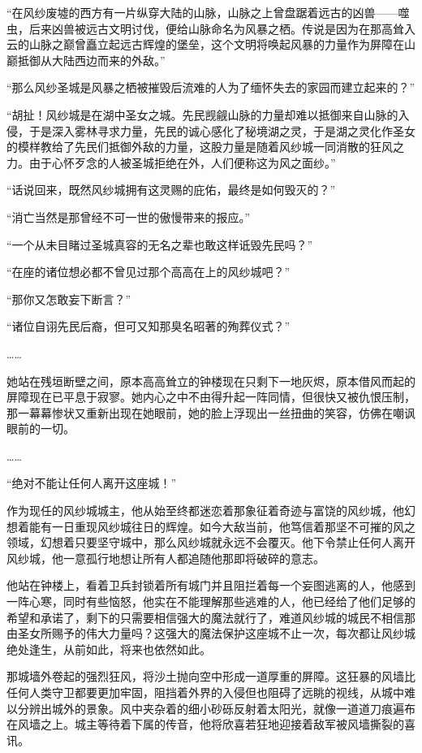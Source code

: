 \clearpage
{}


“在风纱废墟的西方有一片纵穿大陆的山脉，山脉之上曾盘踞着远古的凶兽——噬虫，后来凶兽被远古文明讨伐，便给山脉命名为风暴之栖。传说是因为在那高耸入云的山脉之巅曾矗立起远古辉煌的堡垒，这个文明将唤起风暴的力量作为屏障在山巅抵御从大陆西边而来的外敌。”

“那么风纱圣城是风暴之栖被摧毁后流难的人为了缅怀失去的家园而建立起来的？”

“胡扯！风纱城是在湖中圣女之城。先民觊觎山脉的力量却难以抵御来自山脉的入侵，于是深入雾林寻求力量，先民的诚心感化了秘境湖之灵，于是湖之灵化作圣女的模样教给了先民们抵御外敌的力量，这股力量是随着风纱城一同消散的狂风之力。由于心怀歹念的人被圣城拒绝在外，人们便称这为风之面纱。”

“话说回来，既然风纱城拥有这灵赐的庇佑，最终是如何毁灭的？”

“消亡当然是那曾经不可一世的傲慢带来的报应。”

“一个从未目睹过圣城真容的无名之辈也敢这样诋毁先民吗？”

“在座的诸位想必都不曾见过那个高高在上的风纱城吧？”

“那你又怎敢妄下断言？”

“诸位自诩先民后裔，但可又知那臭名昭著的殉葬仪式？”

……

她站在残垣断壁之间，原本高高耸立的钟楼现在只剩下一地灰烬，原本借风而起的屏障现在已平息于寂寥。她内心之中不由得升起一阵同情，但很快又被仇恨压制，那一幕幕惨状又重新出现在她眼前，她的脸上浮现出一丝扭曲的笑容，仿佛在嘲讽眼前的一切。

……

“绝对不能让任何人离开这座城！”

作为现任的风纱城城主，他从始至终都迷恋着那象征着奇迹与富饶的风纱城，他幻想着能有一日重现风纱城往日的辉煌。如今大敌当前，他笃信着那坚不可摧的风之领域，幻想着只要坚守城中，那么风纱城就永远不会覆灭。他下令禁止任何人离开风纱城，他一意孤行地想让所有人都追随他那即将破碎的意志。

他站在钟楼上，看着卫兵封锁着所有城门并且阻拦着每一个妄图逃离的人，他感到一阵心寒，同时有些恼怒，他实在不能理解那些逃难的人，他已经给了他们足够的希望和承诺了，剩下的只需要相信强大的魔法就行了，难道风纱城的城民不相信那由圣女所赐予的伟大力量吗？这强大的魔法保护这座城不止一次，每次都让风纱城绝处逢生，从前如此，将来也依然如此。

那城墙外卷起的强烈狂风，将沙土抛向空中形成一道厚重的屏障。这狂暴的风墙比任何人类守卫都要更加牢固，阻挡着外界的入侵但也阻碍了远眺的视线，从城中难以分辨出城外的景象。风中夹杂着的细小砂砾反射着太阳光，就像一道道刀痕遍布在风墙之上。城主等待着下属的传音，他将欣喜若狂地迎接着敌军被风墙撕裂的喜讯。

